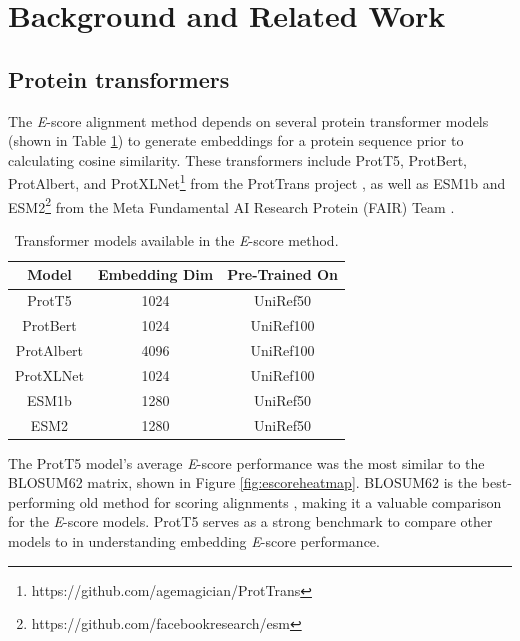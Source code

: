 \documentclass[
	letterpaper, %
	10pt, %
]{journalArticle}
\begin{document}
\section{Background and Related Work}

\subsection{Protein transformers}
The \textit{E}-score alignment method depends on several protein transformer models (shown in Table \ref{tab:transformers}) to generate embeddings for a protein sequence prior to calculating cosine similarity. These transformers include ProtT5, ProtBert, ProtAlbert, and ProtXLNet\footnote{https://github.com/agemagician/ProtTrans} from the ProtTrans project \autocite{Elnaggar:2021}, as well as ESM1b and ESM2\footnote{https://github.com/facebookresearch/esm} from the Meta Fundamental AI Research Protein (FAIR) Team \autocite{Rives:2021}.

\begin{table} %
	\caption{Transformer models available in the \textit{E}-score method.}
	\centering
	\begin{tabular}{ |c|c|c| }
		\toprule
		Model & Embedding Dim & Pre-Trained On \\
		\midrule
		ProtT5 & 1024 & UniRef50 \\
		ProtBert & 1024 & UniRef100 \\
		ProtAlbert & 4096 & UniRef100 \\
            ProtXLNet & 1024 & UniRef100 \\
            ESM1b & 1280 & UniRef50 \\
            ESM2 & 1280 & UniRef50 \\
		\bottomrule
	\end{tabular}
	\label{tab:transformers}
\end{table}

The ProtT5 model's average \textit{E}-score performance was the most similar to the BLOSUM62 matrix, shown in Figure \ref{fig:escoreheatmap}. BLOSUM62 is the best-performing old method for scoring alignments \autocite{Ashrafzadeh:2023}, making it a valuable comparison for the \textit{E}-score models. ProtT5 serves as a strong benchmark to compare other models to in understanding embedding \textit{E}-score performance.
\end{document}
